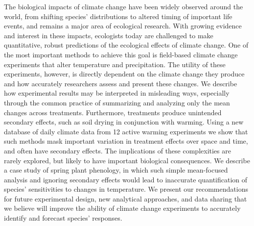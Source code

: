 \documentclass[11pt,a4paper]{letter}
\begin{document}
\begin{letter}{}
The biological impacts of climate change have been widely observed around the world, from shifting species' distributions to altered timing of important life events, and remains a major area of ecological research. With growing evidence and interest in these impacts, ecologists today are challenged to make quantitative, robust predictions of the ecological effects of climate change. One of the most important methods to achieve this goal is field-based climate change experiments that alter temperature and precipitation. The utility of these experiments, however, is directly dependent on the climate change they produce and how accurately researchers assess and present these changes. We describe how experimental results may be interpreted in misleading ways, especially through the common practice of summarizing and analyzing only the mean changes across treatments. Furthermore, treatments produce unintended secondary effects, such as soil drying in conjunction with warming. Using a new database of daily climate data from 12 active warming experiments we show that such methods mask important variation in treatment effects over space and time, and often have secondary effects. The implications of these complexities are rarely explored, but likely to have important biological consequences. We describe a case study of spring plant phenology, in which such simple mean-focused analysis and ignoring secondary effects would lead to inaccurate quantification of species' sensitivities to changes in temperature. We present our recommendations for future experimental design, new analytical approaches, and data sharing that we believe will improve the ability of climate change experiments to accurately identify and forecast species' responses.




\end{letter}
\end{document}

